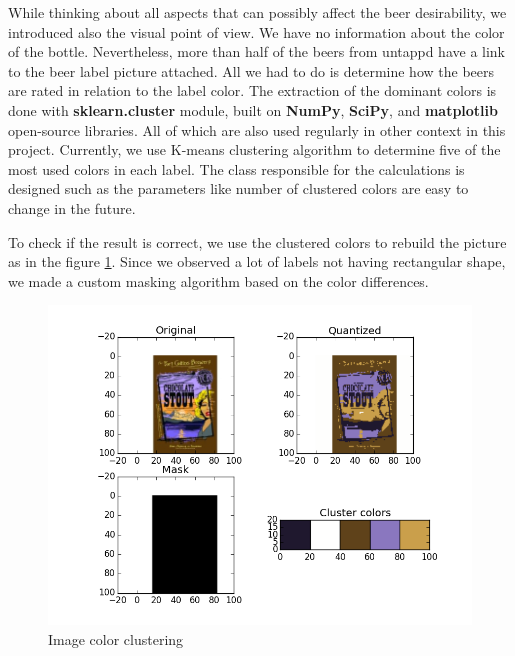 \documentclass[10pt]{IEEEtran}
\begin{document}
While thinking about all aspects that can possibly affect the beer desirability, we introduced also the visual point of view. We have no information about the color of the bottle. Nevertheless, more than half of the beers from untappd have a link to the beer label picture attached. All we had to do is determine how the beers are rated in relation to the label color. The extraction of the dominant colors is done with \textbf{sklearn.cluster} module, built on \textbf{NumPy}, \textbf{SciPy}, and \textbf{matplotlib} open-source libraries. All of which are also used regularly in other context in this project. Currently, we use K-means clustering algorithm to determine five of the most used colors in each label. The class responsible for the calculations is designed such as the parameters like number of clustered colors are easy to change in the future.

To check if the result is correct, we use the clustered colors to rebuild the picture as in the figure \ref{fig:colorClustering}. Since we observed a lot of labels not having rectangular shape, we made a custom masking algorithm based on the color differences. 

\begin{figure}[b]
  \centering
  \includegraphics[width=\columnwidth]{./graphics/1.png}
  \caption{Image color clustering}
  \label{fig:colorClustering}
\end{figure}
\end{document}
